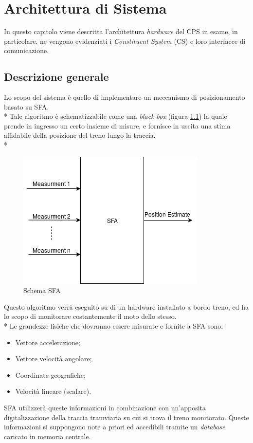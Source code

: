 \chapter{Architettura di Sistema}
In questo capitolo viene descritta l'architettura \emph{hardware} del CPS in esame, in particolare, ne vengono evidenziati i \emph{Constituent System} (CS) e loro interfacce di comunicazione.
\section{Descrizione generale}
Lo scopo del sistema \`e quello di implementare un meccanismo di posizionamento basato su SFA.\\*
Tale algoritmo \`e schematizzabile come una \emph{black-box} (figura \ref{fig:sfa}) la quale prende in ingresso un certo insieme di misure, e fornisce in uscita una stima affidabile della posizione del treno lungo la traccia.\\*
\begin{figure}[h]
	\centering
	\includegraphics[scale=0.75]{img/sfaschema}
	\caption{Schema SFA}
	\label{fig:sfa}
\end{figure}
\clearpage
Questo algoritmo verr\`a eseguito su di un hardware installato a bordo treno, ed ha lo scopo di monitorare costantemente il moto dello stesso.\\*
Le grandezze fisiche che dovranno essere misurate e fornite a SFA sono:
\begin{itemize}
	\item Vettore accelerazione;
	\item Vettore velocit\`a angolare;
	\item Coordinate geografiche;
	\item Velocit\`a lineare (scalare).
\end{itemize}
SFA utilizzer\`a queste informazioni in combinazione con un'apposita digitalizzazione della traccia tramviaria su cui si trova il treno monitorato. Queste informazioni si suppongono note a priori ed accedibili tramite un \emph{database} caricato in memoria centrale.

